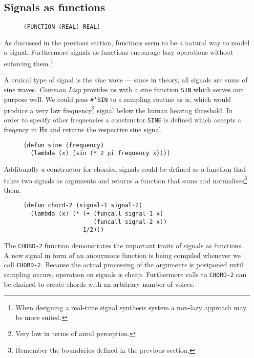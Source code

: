 \subsection{Signals as functions}

\begin{figure}
\centering
\texttt{(FUNCTION (REAL) REAL)}
\end{figure}

As discussed in the previous section, functions seem to be a natural way
to model a signal. Furthermore signals as functions encourage lazy
operations without enforcing them.\footnote{When designing a real-time
signal synthesis system a non-lazy approach may be more suited.}

A cruical type of signal is the sine wave --- since in theory, all
signals are sums of sine waves. \textit{Common Lisp} provides us with a
sine function \texttt{SIN} which serves our purpose well. We could pass
\texttt{#'SIN} to a sampling routine as is, which would produce a very
low frequency\footnote{Very low in terms of aural perception.} signal
below the human hearing threshold. In order to specify other frequencies
a constructor \texttt{SINE} is defined which accepts a freqency in Hz and
returns the respective sine signal.

\begin{figure}
\centering
\begin{verbatim}
(defun sine (frequency)
  (lambda (x) (sin (* 2 pi frequency x))))
\end{verbatim}
\end{figure}

Additonally a constructor for chorded signals could be defined as a
function that takes two signals as arguments and returns a function that
sums and normalises\footnote{Remember the boundaries defined in the
previous section.} them.

\begin{figure}
\centering
\begin{verbatim}
(defun chord-2 (signal-1 signal-2)
  (lambda (x) (* (+ (funcall signal-1 x)
                    (funcall signal-2 x))
                 1/2)))
\end{verbatim}
\end{figure}

The \texttt{CHORD-2} function demonstrates the important traits of
signals as functions. A new signal in form of an anonymous function is
being compiled whenever we call \texttt{CHORD-2}. Because the actual
processing of the arguments is postponed until sampling occurs,
operation on signals is cheap. Furthermore calls to \texttt{CHORD-2}
can be chained to create chords with an arbitrary number of voices.
